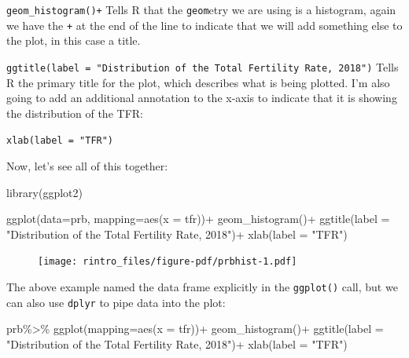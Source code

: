 \documentclass[
  letterpaper,
  DIV=11,
  numbers=noendperiod]{scrreprt}
\newenvironment{Shaded}{\begin{snugshade}}{\end{snugshade}}
\newcommand{\AttributeTok}[1]{\textcolor[rgb]{0.40,0.45,0.13}{#1}}
\newcommand{\FunctionTok}[1]{\textcolor[rgb]{0.28,0.35,0.67}{#1}}
\newcommand{\NormalTok}[1]{\textcolor[rgb]{0.00,0.23,0.31}{#1}}
\newcommand{\SpecialCharTok}[1]{\textcolor[rgb]{0.37,0.37,0.37}{#1}}
\newcommand{\StringTok}[1]{\textcolor[rgb]{0.13,0.47,0.30}{#1}}
\begin{document}
\texttt{geom\_histogram()+} Tells R that the \texttt{geom}etry we are
using is a histogram, again we have the \texttt{+} at the end of the
line to indicate that we will add something else to the plot, in this
case a title.

\texttt{ggtitle(label\ =\ "Distribution\ of\ the\ Total\ Fertility\ Rate,\ 2018")}
Tells R the primary title for the plot, which describes what is being
plotted. I'm also going to add an additional annotation to the x-axis to
indicate that it is showing the distribution of the TFR:

\texttt{xlab(label\ =\ "TFR")}

Now, let's see all of this together:

\begin{Shaded}
\begin{Highlighting}[]
\FunctionTok{library}\NormalTok{(ggplot2)}

\FunctionTok{ggplot}\NormalTok{(}\AttributeTok{data=}\NormalTok{prb,}
       \AttributeTok{mapping=}\FunctionTok{aes}\NormalTok{(}\AttributeTok{x =}\NormalTok{ tfr))}\SpecialCharTok{+}
  \FunctionTok{geom\_histogram}\NormalTok{()}\SpecialCharTok{+}
  \FunctionTok{ggtitle}\NormalTok{(}\AttributeTok{label =} \StringTok{"Distribution of the Total Fertility Rate, 2018"}\NormalTok{)}\SpecialCharTok{+}
  \FunctionTok{xlab}\NormalTok{(}\AttributeTok{label =} \StringTok{"TFR"}\NormalTok{)}
\end{Highlighting}
\end{Shaded}

\begin{figure}[H]

{\centering \texttt{[image: rintro\_files/figure-pdf/prbhist-1.pdf]}

}

\end{figure}

The above example named the data frame explicitly in the
\texttt{ggplot()} call, but we can also use \texttt{dplyr} to pipe data
into the plot:

\begin{Shaded}
\begin{Highlighting}[]
\NormalTok{prb}\SpecialCharTok{\%\textgreater{}\%}
  \FunctionTok{ggplot}\NormalTok{(}\AttributeTok{mapping=}\FunctionTok{aes}\NormalTok{(}\AttributeTok{x =}\NormalTok{ tfr))}\SpecialCharTok{+}
  \FunctionTok{geom\_histogram}\NormalTok{()}\SpecialCharTok{+}
  \FunctionTok{ggtitle}\NormalTok{(}\AttributeTok{label =} \StringTok{"Distribution of the Total Fertility Rate, 2018"}\NormalTok{)}\SpecialCharTok{+}
  \FunctionTok{xlab}\NormalTok{(}\AttributeTok{label =} \StringTok{"TFR"}\NormalTok{)}
\end{Highlighting}
\end{Shaded}
\end{document}
